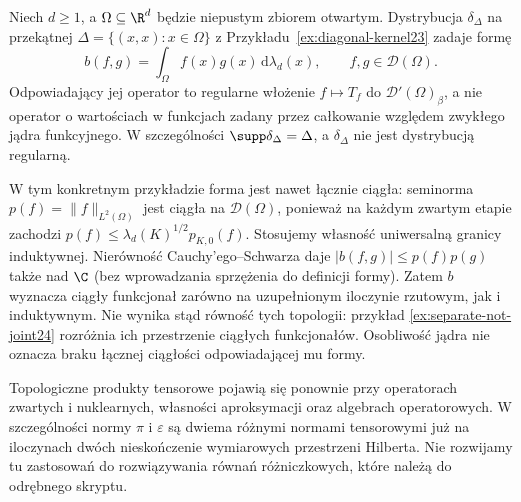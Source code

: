 \begin{przyklad}
\label{ex:diag-tensor24}
Niech $d\ge1$, a $\Omega\subseteq\R^d$ będzie
niepustym zbiorem otwartym. Dystrybucja
$\delta_\Delta$ na przekątnej $\Delta=\{(x,x):x\in\Omega\}$
z Przykładu~\ref{ex:diagonal-kernel23} zadaje formę
\[
 b(f,g)=\int_\Omega f(x)g(x)\,\mathrm d\lambda_d(x),
 \qquad f,g\in\mathcal D(\Omega).
\]
Odpowiadający jej operator to regularne włożenie
$f\mapsto T_f$ do $\mathcal D'(\Omega)_\beta$,
a nie operator o wartościach w funkcjach zadany
przez całkowanie względem zwykłego jądra funkcyjnego.
W szczególności $\supp\delta_\Delta=\Delta$,
a $\delta_\Delta$ nie jest dystrybucją regularną.

W tym konkretnym przykładzie forma jest nawet
łącznie ciągła: seminorma
$p(f)=\|f\|_{L^2(\Omega)}$ jest ciągła na
$\mathcal D(\Omega)$, ponieważ na każdym zwartym
etapie zachodzi
$p(f)\le\lambda_d(K)^{1/2}p_{K,0}(f)$.
Stosujemy własność uniwersalną granicy induktywnej.
Nierówność Cauchy'ego--Schwarza daje
$|b(f,g)|\le p(f)p(g)$ także nad $\C$
(bez wprowadzania sprzężenia do definicji formy).
Zatem $b$ wyznacza ciągły funkcjonał zarówno na
uzupełnionym iloczynie rzutowym, jak i induktywnym.
Nie wynika stąd równość tych topologii: przykład
\ref{ex:separate-not-joint24} rozróżnia ich
przestrzenie ciągłych funkcjonałów.
Osobliwość jądra nie oznacza braku łącznej
ciągłości odpowiadającej mu formy.
\end{przyklad}

\begin{uwaga}
\label{rem:tensor-next24}
Topologiczne produkty tensorowe pojawią się ponownie
przy operatorach zwartych i nuklearnych, własności
aproksymacji oraz algebrach operatorowych.
W szczególności normy $\pi$ i $\varepsilon$ są dwiema
różnymi normami tensorowymi już na iloczynach dwóch
nieskończenie wymiarowych przestrzeni Hilberta.
Nie rozwijamy tu zastosowań do rozwiązywania równań
różniczkowych, które należą do odrębnego skryptu.
\end{uwaga}
